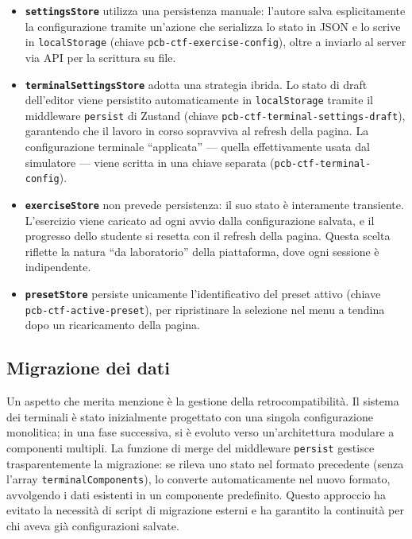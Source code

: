 \begin{itemize}
    \item \textbf{\texttt{settingsStore}} utilizza una persistenza manuale: l'autore salva esplicitamente la configurazione tramite un'azione che serializza lo stato in JSON e lo scrive in \texttt{localStorage} (chiave \texttt{pcb-ctf-exercise-config}), oltre a inviarlo al server via API per la scrittura su file.

    \item \textbf{\texttt{terminalSettingsStore}} adotta una strategia ibrida. Lo stato di draft dell'editor viene persistito automaticamente in \texttt{localStorage} tramite il middleware \texttt{persist} di Zustand (chiave \texttt{pcb-ctf-terminal-settings-draft}), garantendo che il lavoro in corso sopravviva al refresh della pagina. La configurazione terminale ``applicata'' --- quella effettivamente usata dal simulatore --- viene scritta in una chiave separata (\texttt{pcb-ctf-terminal-config}).

    \item \textbf{\texttt{exerciseStore}} non prevede persistenza: il suo stato è interamente transiente. L'esercizio viene caricato ad ogni avvio dalla configurazione salvata, e il progresso dello studente si resetta con il refresh della pagina. Questa scelta riflette la natura ``da laboratorio'' della piattaforma, dove ogni sessione è indipendente.

    \item \textbf{\texttt{presetStore}} persiste unicamente l'identificativo del preset attivo (chiave \texttt{pcb-ctf-active-preset}), per ripristinare la selezione nel menu a tendina dopo un ricaricamento della pagina.
\end{itemize}

\subsection{Migrazione dei dati}

Un aspetto che merita menzione è la gestione della retrocompatibilità. Il sistema dei terminali è stato inizialmente progettato con una singola configurazione monolitica; in una fase successiva, si è evoluto verso un'architettura modulare a componenti multipli. La funzione di merge del middleware \texttt{persist} gestisce trasparentemente la migrazione: se rileva uno stato nel formato precedente (senza l'array \texttt{terminalComponents}), lo converte automaticamente nel nuovo formato, avvolgendo i dati esistenti in un componente predefinito. Questo approccio ha evitato la necessità di script di migrazione esterni e ha garantito la continuità per chi aveva già configurazioni salvate.


